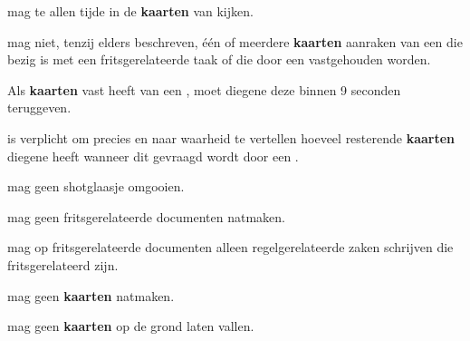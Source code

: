 
\vervolgLijst{}
\item \EenSpeler mag te allen tijde in de \textbf{kaarten} van \alleSpelers kijken.
\eindLijst{}

\vervolgLijst{}
\item \EenSpeler mag niet, tenzij elders beschreven, \'e\'en of meerdere \textbf{kaarten} aanraken van een \medeSpeler die bezig is met een fritsgerelateerde taak of die door een \medeSpeler vastgehouden worden.
\eindLijst{}

\vervolgLijst{}
\item Als \eenSpeler \textbf{kaarten} vast heeft van een \medeSpelerN, moet diegene deze binnen 9 seconden teruggeven.
\eindLijst{}

\vervolgLijst{}
\item \EenSpeler is verplicht om precies en naar waarheid te vertellen hoeveel resterende \textbf{kaarten} diegene heeft wanneer dit gevraagd wordt door een \medeSpelerN.
\label{regel:waarheid_hoeveel_kaarten}
\eindLijst{}

\footnotetext[2]{\footnoteEenDubbeleFritsNemen}
\footnotetext[3]{\footnoteFritsjeDesNemen}

\newpage
{}
\label{hoofdstuk:algemeen_einde}



\vervolgLijst{}
\item \EenSpeler mag geen shotglaasje omgooien.
\eindLijst{}

\vervolgLijst{}
\item \EenSpeler mag geen fritsgerelateerde documenten natmaken.
\eindLijst{}

\vervolgLijst{}
\item \EenSpeler mag op fritsgerelateerde documenten alleen regelgerelateerde zaken schrijven die fritsgerelateerd zijn.
\eindLijst{}

\vervolgLijst{}
\item \EenSpeler mag geen \textbf{kaarten} natmaken.
\eindLijst{}

\vervolgLijst{}
\item \EenSpeler mag geen \textbf{kaarten} op de grond laten vallen.
\eindLijst{}

